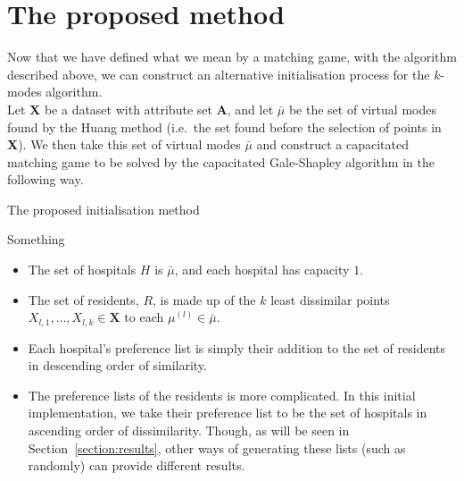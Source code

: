 \documentclass{article}
\theoremstyle{definition}
\begin{document}
\section{The proposed method}\label{section:new-method}

Now that we have defined what we mean by a matching game, with the algorithm 
described above, we can construct an alternative initialisation process for the 
$k$-modes algorithm. \\

Let \textbf{X} be a dataset with attribute set \textbf{A}, and let \(\bar{\mu}\) 
be the set of virtual modes found by the Huang method (i.e.\ the set found 
before the selection of points in \textbf{X}). We then take this set of virtual 
modes \(\bar{\mu}\) and construct a capacitated matching game to be solved by 
the capacitated Gale-Shapley algorithm in the following way.

\begin{algorithm}[H]
\caption{The proposed initialisation method}
    \begin{algorithmic}[0]
            \State Something
        \EndFor
    \end{algorithmic}
\end{algorithm}



\begin{itemize}
    \item The set of hospitals \(H\) is \(\bar{\mu}\), and each hospital has 
        capacity \(1\).

    \item The set of residents, \(R\), is made up of the \(k\) least dissimilar 
        points \(X_{l,1}, \ldots, X_{l,k} \in \textbf{X}\) to each \(\mu^{(l)} 
        \in \bar{\mu}\).

	\item Each hospital's preference list is simply their addition to the set of
        residents in descending order of similarity.
	
	\item The preference lists of the residents is more complicated. In this 
        initial implementation, we take their preference list to be the set of 
        hospitals in ascending order of dissimilarity. Though, as will be seen 
        in Section~\ref{section:results}, other ways of generating these lists 
        (such as randomly) can provide different results.
\end{itemize}
\end{document}
